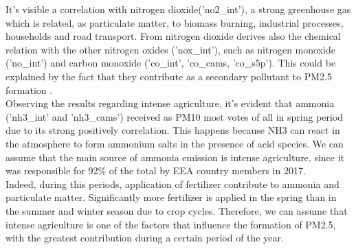 It's visible a correlation with nitrogen dioxide('no2\_int'), a strong greenhouse gas which is related, as particulate matter, to biomass burning, industrial processes, households and road transport\cite{zellner2000john}\cite{maranzano2022air}.
From nitrogen dioxide derives also the chemical relation with the other nitrogen oxides ('nox\_int'), such as nitrogen monoxide ('no\_int') and carbon monoxide ('co\_int', 'co\_cams, 'co\_s5p'). This could be explained by the fact that they contribute as a secondary pollutant to PM2.5 formation \cite{xie2015spatiotemporal}.
\\
Observing the results regarding intense agriculture, it's evident that ammonia ('nh3\_int' and 'nh3\_cams') received as PM10 most votes of all in spring period due to its strong positively correlation. 
This happens because NH3 can react in the atmosphere to form ammonium salts in the presence of acid species\cite{viatte2021ammonia}.
We can assume that the main source of ammonia emission is intense agriculture, since it was responsible for 92\% of the total by EEA country members in 2017\cite{maranzano2022air}.\\
Indeed, during this periods, application of fertilizer contribute to ammonia and particulate matter.
Significantly more fertilizer is applied in the spring than in the summer and winter season due to crop cycles\cite{goebes2003ammonia}.
Therefore, we can assume that intense agriculture is one of the factors that influence the formation of PM2.5, with the greatest contribution during a certain period of the year.
